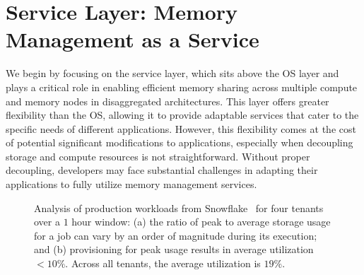 \chapter{Service Layer: Memory Management as a Service}
\label{chap:service}


We begin by focusing on the service layer, which sits above the OS layer and plays a critical role in enabling efficient memory sharing across multiple compute and memory nodes in disaggregated architectures. This layer offers greater flexibility than the OS, allowing it to provide adaptable services that cater to the specific needs of different applications. However, this flexibility comes at the cost of potential significant modifications to applications, especially when decoupling storage and compute resources is not straightforward. Without proper decoupling, developers may face substantial challenges in adapting their applications to fully utilize memory management services.

\begin{figure}[t]
  \centering
  \caption[Snowflake workload anaylsis.]{\small{Analysis of production workloads from Snowflake~\cite{snowset} for four tenants over a $1$ hour window: (a) the ratio of peak to average storage usage for a job can vary by an order of magnitude during its execution; and (b) provisioning for peak usage results in average utilization $<10\%$. Across all tenants, the average utilization is $19\%$.}}\label{fig:ephemerals}%
\end{figure}


